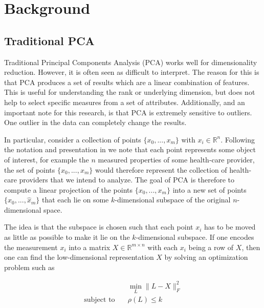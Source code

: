 \documentclass[conference]{IEEEtran}
\begin{document}
\section{Background}
\subsection{Traditional PCA} \label{PCA}
Traditional Principal Components Analysis (PCA) works well for dimensionality reduction.  However, it is often seen as difficult to interpret.  The reason for this is that PCA produces a set of results which are a linear combination of features.  This is useful for understanding the rank or underlying dimension, but does not help to select specific measures from a set of attributes. Additionally, and an important note for this research, is that PCA is extremely sensitive to outliers.  One outlier in the data can completely change the results.

In particular, consider a collection of
points $\{x_0,...,x_m\}$ with $x_i \in \mathbb{R}^n$.  Following the notation and presentation in \cite{paffenroth2018robust} we note that each point represents some object of interest, for example the $n$ measured properties of some health-care provider, the set of points $\{x_0,...,x_m\}$ would therefore
represent the collection of health-care providers that we intend to analyze.
The goal of PCA is therefore to compute a linear projection of the points $\{x_0,...,x_m\}$ into a new
set of points $\{\hat{x}_0,...,\hat{x}_m\}$ that each lie on some $k$-dimensional subspace of the original
$n$-dimensional space.  

The idea is that the subspace is chosen such that each point $x_i$ has to be moved as little as possible
to make it lie on the $k$-dimensional subspace.  If one encodes the measurement $x_i$ into a matrix
$X \in \mathbb{R}^{m \times n}$ with each $x_i$ being a row of $X$, then one can find
the low-dimensional representation $X$ by solving an optimization problem such as 

\begin{align} \label{PCAopt}
  &\min_{L} \| L-X \|_F^2 \\ \nonumber
  \text{subject to}\quad & \rho(L) \le k
\end{align}
\end{document}
